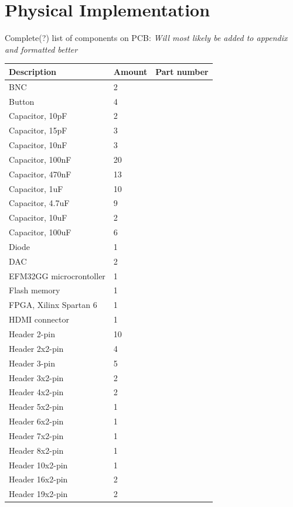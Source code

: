 \chapter{Physical Implementation}
Complete(?) list of components on PCB: \textit{Will most likely be added to appendix and formatted better}

\begin{longtable}{| p{5cm} | p{2cm} | p{2cm} |}
	\hline
	\textbf{Description} & \textbf{Amount} & \textbf{Part number} \\ [0.5ex] 
	\hline
	BNC & 2 &\\ \hline
	Button & 4 &\\ \hline
	Capacitor, 10pF & 2 &\\ \hline
	Capacitor, 15pF & 3 &\\ \hline
	Capacitor, 10nF & 3 &\\ \hline
	Capacitor, 100nF & 20 &\\ \hline
	Capacitor, 470nF & 13 &\\ \hline
	Capacitor, 1uF & 10 &\\ \hline
	Capacitor, 4.7uF & 9 &\\ \hline
	Capacitor, 10uF & 2 &\\ \hline
	Capacitor, 100uF & 6 &\\ \hline
	Diode & 1 &\\ \hline
	DAC & 2 &\\ \hline
	EFM32GG microcrontoller & 1 &\\ \hline
	Flash memory & 1 &\\ \hline
	FPGA, Xilinx Spartan 6 & 1 &\\ \hline
	HDMI connector & 1 &\\ \hline
	Header 2-pin & 10 &\\ \hline
	Header 2x2-pin & 4 &\\ \hline
	Header 3-pin & 5 &\\ \hline
	Header 3x2-pin & 2 &\\ \hline
	Header 4x2-pin & 2 &\\ \hline
	Header 5x2-pin & 1 &\\ \hline
	Header 6x2-pin & 1 &\\ \hline
	Header 7x2-pin & 1 &\\ \hline
	Header 8x2-pin & 1 &\\ \hline
	Header 10x2-pin & 1 &\\ \hline
	Header 16x2-pin & 2 &\\ \hline
	Header 19x2-pin & 2 &\\ \hline

\end{longtable}
